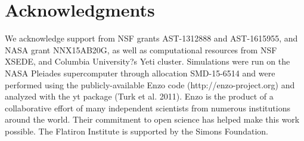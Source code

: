 \documentclass[useAMS,usenatbib]{mn2e}
\begin{document}
% 
\section*{Acknowledgments}

We acknowledge support from NSF grants AST-1312888 and AST-1615955, and NASA grant NNX15AB20G, as well as computational resources from NSF XSEDE, and Columbia University?s Yeti cluster. Simulations were run on the NASA Pleiades supercomputer through allocation SMD-15-6514 and were performed using the publicly-available Enzo code (http://enzo-project.org) and analyzed with the yt package (Turk et al. 2011). Enzo is the product of a collaborative effort of many independent scientists from numerous institutions around the world. Their commitment to open science has helped make this work possible.  The Flatiron Institute is supported by the Simons Foundation. 


%
\end{document}
